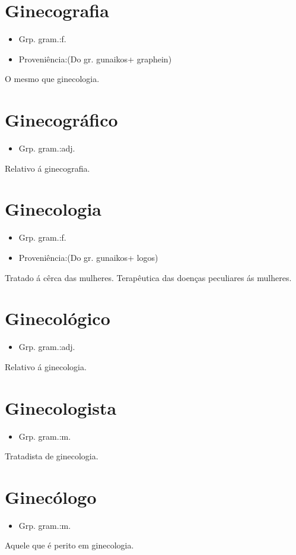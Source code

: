 \section{Ginecografia}
\begin{itemize}
\item {Grp. gram.:f.}
\end{itemize}
\begin{itemize}
\item {Proveniência:(Do gr. \textunderscore gunaikos\textunderscore  + \textunderscore graphein\textunderscore )}
\end{itemize}
O mesmo que \textunderscore ginecologia\textunderscore .
\section{Ginecográfico}
\begin{itemize}
\item {Grp. gram.:adj.}
\end{itemize}
Relativo á ginecografia.
\section{Ginecologia}
\begin{itemize}
\item {Grp. gram.:f.}
\end{itemize}
\begin{itemize}
\item {Proveniência:(Do gr. \textunderscore gunaikos\textunderscore  + \textunderscore logos\textunderscore )}
\end{itemize}
Tratado á cêrca das mulheres.
Terapêutica das doenças peculiares ás mulheres.
\section{Ginecológico}
\begin{itemize}
\item {Grp. gram.:adj.}
\end{itemize}
Relativo á ginecologia.
\section{Ginecologista}
\begin{itemize}
\item {Grp. gram.:m.}
\end{itemize}
Tratadista de ginecologia.
\section{Ginecólogo}
\begin{itemize}
\item {Grp. gram.:m.}
\end{itemize}
Aquele que é perito em ginecologia.
